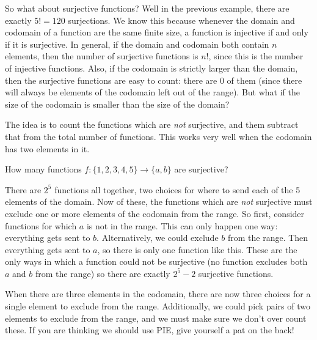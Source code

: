 \documentclass[12pt]{article}
\begin{document}
So what about surjective functions?  Well in the previous example, there are exactly $5! = 120$ surjections.  We know this because whenever the domain and codomain of a function are the same finite size, a function is injective if and only if it is surjective.  In general, if the domain and codomain both contain $n$ elements, then the number of surjective functions is $n!$, since this is the number of injective functions.  Also, if the codomain is strictly larger than the domain, then the surjective functions are easy to count: there are 0 of them (since there will always be elements of the codomain left out of the range).  But what if the size of the codomain is smaller than the size of the domain?

The idea is to count the functions which are {\em not} surjective, and them subtract that from the total number of functions.  This works very well when the codomain has two elements in it.

\begin{example}
  How many functions $f: \{1,2,3,4,5\} \to \{a,b\}$ are surjective?
  \begin{solution}
    There are $2^5$ functions all together, two choices for where to send each of the 5 elements of the domain.  Now of these, the functions which are {\em not} surjective must exclude one or more elements of the codomain from the range.  So first, consider functions for which $a$ is not in the range.  This can only happen one way: everything gets sent to $b$.  Alternatively, we could exclude $b$ from the range.  Then everything gets sent to $a$, so there is only one function like this.  These are the only ways in which a function could not be surjective (no function excludes both $a$ and $b$ from the range) so there are exactly $2^5 - 2$ surjective functions.
  \end{solution}
\end{example}

When there are three elements in the codomain, there are now three choices for a single element to exclude from the range.  Additionally, we could pick pairs of two elements to exclude from the range, and we must make sure we don't over count these.  If you are thinking we should use PIE, give yourself a pat on the back!
\end{document}

